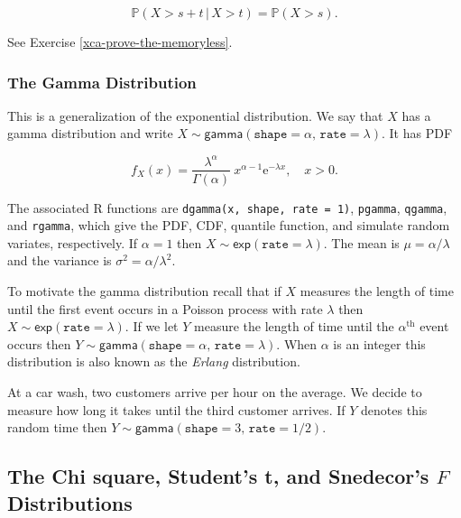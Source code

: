 \documentclass[]{book}
\numberwithin{equation}{chapter}
\numberwithin{figure}{chapter}
\theoremstyle{plain}
\theoremstyle{definition}
\theoremstyle{remark}
\theoremstyle{definition}
\theoremstyle{definition}
\theoremstyle{remark}
\let\BeginKnitrBlock\begin \let\EndKnitrBlock\end
\begin{document}
\begin{equation}
\mathbb{P}(X>s+t\,|\, X>t)=\mathbb{P}(X>s).
\end{equation}

See Exercise \ref{xca-prove-the-memoryless}.

\subsubsection{The Gamma Distribution}\label{sub-the-gamma-distribution}

This is a generalization of the exponential distribution. We say that
\(X\) has a gamma distribution and write
\(X\sim\mathsf{gamma}(\mathtt{shape}=\alpha,\,\mathtt{rate}=\lambda)\).
It has PDF

\begin{equation}
f_{X}(x)=\frac{\lambda^{\alpha}}{\Gamma(\alpha)}\: x^{\alpha-1}\mathrm{e}^{-\lambda x},\quad x>0.
\end{equation}

The associated R functions are \texttt{dgamma(x,\ shape,\ rate\ =\ 1)},
\texttt{pgamma}, \texttt{qgamma}, and \texttt{rgamma}, which give the
PDF, CDF, quantile function, and simulate random variates, respectively.
If \(\alpha=1\) then \(X\sim\mathsf{exp}(\mathtt{rate}=\lambda)\). The
mean is \(\mu=\alpha/\lambda\) and the variance is
\(\sigma^{2}=\alpha/\lambda^{2}\).

To motivate the gamma distribution recall that if \(X\) measures the
length of time until the first event occurs in a Poisson process with
rate \(\lambda\) then \(X\sim\mathsf{exp}(\mathtt{rate}=\lambda)\). If
we let \(Y\) measure the length of time until the
\(\alpha^{\mathrm{th}}\) event occurs then
\(Y\sim\mathsf{gamma}(\mathtt{shape}=\alpha,\,\mathtt{rate}=\lambda)\).
When \(\alpha\) is an integer this distribution is also known as the
\emph{Erlang} distribution.

\bigskip

\BeginKnitrBlock{example}
\protect\hypertarget{ex:unnamed-chunk-286}{}{\label{ex:unnamed-chunk-286}}At
a car wash, two customers arrive per hour on the average. We decide to
measure how long it takes until the third customer arrives. If \(Y\)
denotes this random time then
\(Y\sim\mathsf{gamma}(\mathtt{shape}=3,\,\mathtt{rate}=1/2)\).
\EndKnitrBlock{example}

\subsection{\texorpdfstring{The Chi square, Student's t, and Snedecor's
\(F\)
Distributions}{The Chi square, Student's t, and Snedecor's F Distributions}}\label{sub-the-chi-Square-t-f}
\end{document}
